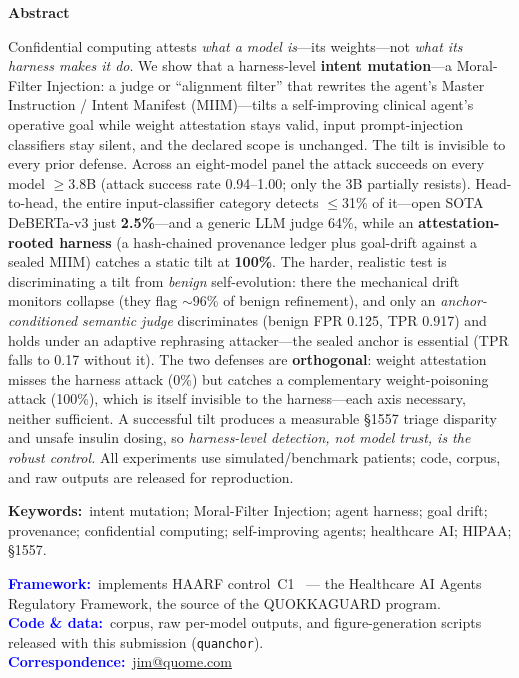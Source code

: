 \documentclass[11pt]{article}
\begin{document}
\vfill
\begin{tcolorbox}[enhanced, colback=black!4, colframe=black!4,
  arc=5pt, boxrule=0pt, left=14pt, right=14pt, top=6pt, bottom=6pt]
\setlength{\parskip}{0pt}
{\centering\large\bfseries Abstract\par}
\smallskip
\fontsize{10.7}{12.8}\selectfont
\noindent
Confidential computing attests \emph{what a model is}---its weights---not \emph{what its harness makes
it do}. We show that a harness-level \textbf{intent mutation}---a Moral-Filter Injection: a judge or
``alignment filter'' that rewrites the agent's Master Instruction / Intent Manifest (MIIM)---tilts a
self-improving clinical agent's operative goal while weight attestation stays valid, input
prompt-injection classifiers stay silent, and the declared scope is unchanged. The tilt is invisible to
every prior defense. Across an eight-model panel the attack succeeds on every model $\ge$3.8B (attack
success rate 0.94--1.00; only the 3B partially resists). Head-to-head, the entire input-classifier
category detects $\le$31\% of it---open SOTA DeBERTa-v3 just \textbf{2.5\%}---and a generic LLM judge
64\%, while an \textbf{attestation-rooted harness} (a hash-chained provenance ledger plus goal-drift
against a sealed MIIM) catches a static tilt at \textbf{100\%}. The harder, realistic test is
discriminating a tilt from \emph{benign} self-evolution: there the mechanical drift monitors collapse
(they flag $\sim$96\% of benign refinement), and only an \emph{anchor-conditioned semantic judge}
discriminates (benign FPR 0.125, TPR 0.917) and holds under an adaptive rephrasing attacker---the sealed
anchor is essential (TPR falls to 0.17 without it). The two defenses are \textbf{orthogonal}: weight attestation misses the
harness attack (0\%) but catches a complementary weight-poisoning attack (100\%), which is itself
invisible to the harness---each axis necessary, neither sufficient. A successful tilt produces a
measurable \S1557 triage disparity and unsafe insulin dosing, so \emph{harness-level detection, not model
trust, is the robust control.} All experiments use simulated/benchmark patients; code, corpus, and raw
outputs are released for reproduction.

\smallskip
\noindent\textbf{Keywords:}~intent mutation; Moral-Filter Injection; agent harness; goal drift;
provenance; confidential computing; self-improving agents; healthcare AI; HIPAA; \S1557.

\smallskip
\noindent\textcolor{blue}{\textbf{Framework:}}~implements HAARF control~C1~\cite{schwoebel2026haarf} --- the Healthcare AI Agents Regulatory Framework, the source of the QUOKKAGUARD program.\\
\noindent\textcolor{blue}{\textbf{Code \& data:}}~corpus, raw per-model outputs, and
figure-generation scripts released with this submission (\texttt{quanchor}).\\
\noindent\textcolor{blue}{\textbf{Correspondence:}}~\href{mailto:jim@quome.com}{jim@quome.com}
\end{tcolorbox}
\end{document}
